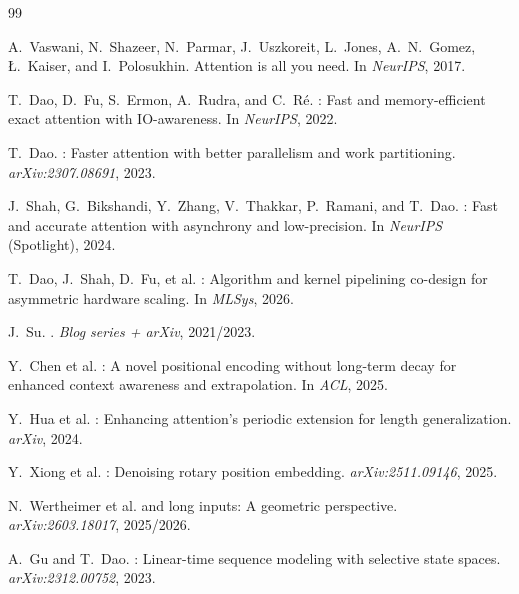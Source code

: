 \documentclass[11pt,a4paper]{article}
\theoremstyle{remark}
\begin{document}
\begin{thebibliography}{99}

A.~Vaswani, N.~Shazeer, N.~Parmar, J.~Uszkoreit, L.~Jones, A.~N.~Gomez, \L.~Kaiser, and I.~Polosukhin.
\newblock Attention is all you need.
\newblock In \emph{NeurIPS}, 2017.

T.~Dao, D.~Fu, S.~Ermon, A.~Rudra, and C.~R\'e.
: Fast and memory-efficient exact attention with {IO}-awareness.
\newblock In \emph{NeurIPS}, 2022.

T.~Dao.
: Faster attention with better parallelism and work partitioning.
\newblock \emph{arXiv:2307.08691}, 2023.

J.~Shah, G.~Bikshandi, Y.~Zhang, V.~Thakkar, P.~Ramani, and T.~Dao.
: Fast and accurate attention with asynchrony and low-precision.
\newblock In \emph{NeurIPS} (Spotlight), 2024.

T.~Dao, J.~Shah, D.~Fu, et al.
: Algorithm and kernel pipelining co-design for asymmetric hardware scaling.
\newblock In \emph{MLSys}, 2026.

J.~Su.
.
\newblock \emph{Blog series + arXiv}, 2021/2023.

Y.~Chen et al.
: A novel positional encoding without long-term decay for enhanced context awareness and extrapolation.
\newblock In \emph{ACL}, 2025.

Y.~Hua et al.
: Enhancing attention's periodic extension for length generalization.
\newblock \emph{arXiv}, 2024.

Y.~Xiong et al.
: Denoising rotary position embedding.
\newblock \emph{arXiv:2511.09146}, 2025.

N.~Wertheimer et al.
 and long inputs: A geometric perspective.
\newblock \emph{arXiv:2603.18017}, 2025/2026.

A.~Gu and T.~Dao.
: Linear-time sequence modeling with selective state spaces.
\newblock \emph{arXiv:2312.00752}, 2023.


\end{thebibliography}
\end{document}
